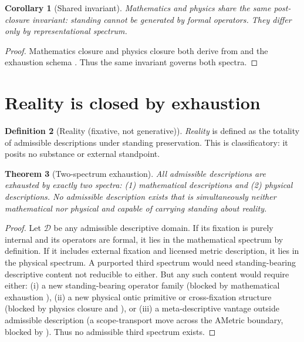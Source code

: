 \documentclass[11pt]{article}
\newtheorem{theorem}{Theorem}[section]
\newtheorem{corollary}[theorem]{Corollary}
\theoremstyle{definition}
\newtheorem{definition}[theorem]{Definition}
\begin{document}
\begin{corollary}[Shared invariant]
\label{cor:shared}
Mathematics and physics share the same post-closure invariant:
\emph{standing cannot be generated by formal operators}.
They differ only by representational spectrum.
\end{corollary}

\begin{proof}
Mathematics closure  and physics closure  both derive from  and the exhaustion schema .
Thus the same invariant governs both spectra.
\end{proof}

\section{Reality is closed by exhaustion}
\label{sec:reality}

\begin{definition}[Reality (fixative, not generative)]
\label{def:reality}
\emph{Reality} is defined as the totality of admissible descriptions under standing preservation.
This is classificatory: it posits no substance or external standpoint.
\end{definition}

\begin{theorem}[Two-spectrum exhaustion]
\label{thm:two-spectrum}
All admissible descriptions are exhausted by exactly two spectra:
(1) mathematical descriptions and (2) physical descriptions.
No admissible description exists that is simultaneously neither mathematical nor physical and capable of carrying standing about reality.
\end{theorem}

\begin{proof}
Let $\mathcal{D}$ be any admissible descriptive domain.
If its fixation is purely internal and its operators are formal, it lies in the mathematical spectrum by definition.
If it includes external fixation and licensed metric description, it lies in the physical spectrum.
A purported third spectrum would need standing-bearing descriptive content not reducible to either.
But any such content would require either:
(i) a new standing-bearing operator family (blocked by mathematical exhaustion ),
(ii) a new physical ontic primitive or cross-fixation structure (blocked by physics closure  and ),
or (iii) a meta-descriptive vantage outside admissible description (a scope-transport move across the AMetric boundary, blocked by ).
Thus no admissible third spectrum exists.
\end{proof}
\end{document}
